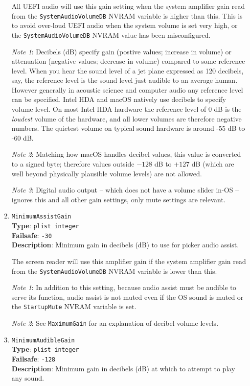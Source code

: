 \documentclass[]{article}
\begin{document}
\begin{enumerate}
  All UEFI audio will use this gain setting when the system amplifier gain read from the \texttt{SystemAudioVolumeDB}
  NVRAM variable is higher than this. This is to avoid over-loud UEFI audio when the system volume is set very high,
  or the \texttt{SystemAudioVolumeDB} NVRAM value has been misconfigured.
  
  \emph{Note 1}: Decibels (dB) specify gain (postive values; increase in volume) or attenuation (negative values; decrease
  in volume) compared to some reference level. When you hear the sound level of a jet plane expressed as 120 decibels, say,
  the reference level is the sound level just audible to an average human. However generally
  in acoustic science and computer audio any reference level can be specified. Intel HDA and macOS natively use
  decibels to specify volume level. On most Intel HDA hardware the reference level of 0 dB is the
  \emph{loudest} volume of the hardware, and all lower volumes are therefore negative numbers. The quietest volume
  on typical sound hardware is around -55 dB to -60 dB.
  
  \emph{Note 2}: Matching how macOS handles decibel values, this value is converted to a signed byte; therefore values
  outside $-128$ dB to $+127$ dB (which are well beyond physically plausible volume levels) are not allowed.

  \emph{Note 3}: Digital audio output -- which does not have a volume slider in-OS -- ignores this and all other gain settings,
  only mute settings are relevant.

  \item
  \texttt{MinimumAssistGain}\\
  \textbf{Type}: \texttt{plist\ integer}\\
  \textbf{Failsafe}: \texttt{-30}\\
  \textbf{Description}: Minimum gain in decibels (dB) to use for picker audio assist.

  The screen reader will use this amplifier gain if the system amplifier gain read from the \texttt{SystemAudioVolumeDB}
  NVRAM variable is lower than this.

  \emph{Note 1}: In addition to this setting, because audio assist must be audible to serve its function, audio assist
  is not muted even if the OS sound is muted or the \texttt{StartupMute} NVRAM variable is set.

  \emph{Note 2}: See \texttt{MaximumGain} for an explanation of decibel volume levels.

  \item
  \texttt{MinimumAudibleGain}\\
  \textbf{Type}: \texttt{plist\ integer}\\
  \textbf{Failsafe}: \texttt{-128}\\
  \textbf{Description}: Minimum gain in decibels (dB) at which to attempt to play any sound.


\end{enumerate}
\end{document}
